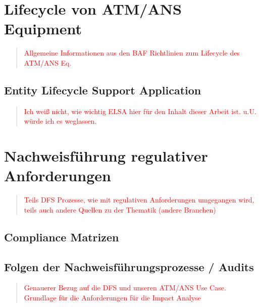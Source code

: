     \section{Lifecycle von ATM/ANS Equipment}

    \begin{quote}
\textcolor{red}{Allgemeine Informationen aus den BAF Richtlinien zum Lifecycle des ATM/ANS Eq.}
\end{quote}
    
        \subsection{Entity Lifecycle Support Application}

\begin{quote}
\textcolor{red}{Ich weiß nicht, wie wichtig ELSA hier für den Inhalt dieser Arbeit ist. u.U. würde ich es weglassen.}
\end{quote}
    \pagebreak
    \section{Nachweisführung regulativer Anforderungen}

\begin{quote}
\textcolor{red}{Teils DFS Prozesse, wie mit regulativen Anforderungen umgegangen wird, teils auch andere Quellen zu der Thematik (andere Branchen)}
\end{quote}
    
        \subsection{Compliance Matrizen}
        
        \subsection{Folgen der Nachweisführungsprozesse / Audits}

        
\begin{quote}
\textcolor{red}{Genauerer Bezug auf die DFS und unseren ATM/ANS Use Case. Grundlage für die Anforderungen für die Impact Analyse}
\end{quote}
        